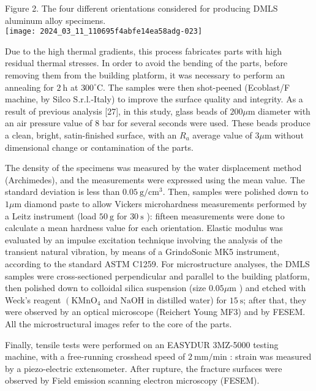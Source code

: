 \documentclass[10pt]{article}
\begin{document}
Figure 2. The four different orientations considered for producing DMLS aluminum alloy specimens.\\
\texttt{[image: 2024\_03\_11\_110695f4abfe14ea58adg-023]}

Due to the high thermal gradients, this process fabricates parts with high residual thermal stresses. In order to avoid the bending of the parts, before removing them from the building platform, it was necessary to perform an annealing for $2 \mathrm{~h}$ at $300^{\circ} \mathrm{C}$. The samples were then shot-peened (Ecoblast/F machine, by Silco S.r.l.-Italy) to improve the surface quality and integrity. As a result of previous analysis [27], in this study, glass beads of $200 \mu \mathrm{m}$ diameter with an air pressure value of 8 bar for several seconds were used. These beads produce a clean, bright, satin-finished surface, with an $R_{a}$ average value of $3 \mu \mathrm{m}$ without dimensional change or contamination of the parts.

The density of the specimens was measured by the water displacement method (Archimedes), and the measurements were expressed using the mean value. The standard deviation is less than $0.05 \mathrm{~g} / \mathrm{cm}^{3}$. Then, samples were polished down to $1 \mu \mathrm{m}$ diamond paste to allow Vickers microhardness measurements performed by a Leitz instrument (load $50 \mathrm{~g}$ for $30 \mathrm{~s}$ ): fifteen measurements were done to calculate a mean hardness value for each orientation. Elastic modulus was evaluated by an impulse excitation technique involving the analysis of the transient natural vibration, by means of a GrindoSonic MK5 instrument, according to the standard ASTM C1259. For microstructure analyses, the DMLS samples were cross-sectioned perpendicular and parallel to the building platform, then polished down to colloidal silica suspension (size $0.05 \mu \mathrm{m}$ ) and etched with Weck's reagent $\left(\mathrm{KMnO}_{4}\right.$ and $\mathrm{NaOH}$ in distilled water) for $15 \mathrm{~s}$; after that, they were observed by an optical microscope (Reichert Young MF3) and by FESEM. All the microstructural images refer to the core of the parts.

Finally, tensile tests were performed on an EASYDUR 3MZ-5000 testing machine, with a free-running crosshead speed of $2 \mathrm{~mm} / \mathrm{min}$ : strain was measured by a piezo-electric extensometer. After rupture, the fracture surfaces were observed by Field emission scanning electron microscopy (FESEM).
\end{document}
